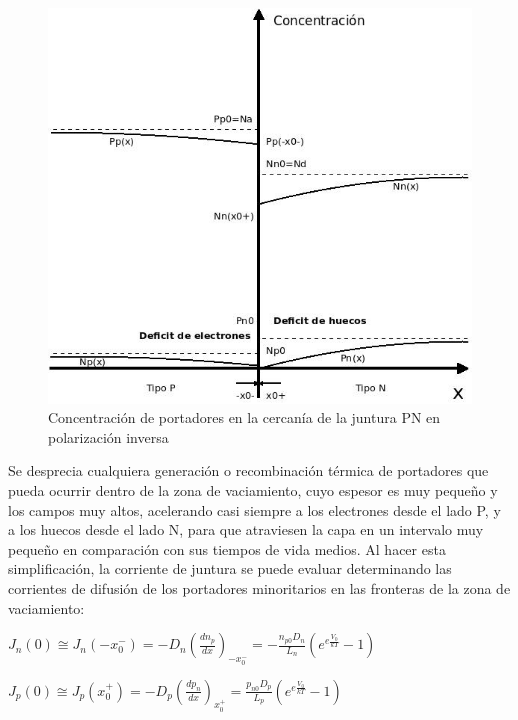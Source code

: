 \documentclass[oneside]{book}
\numberwithin{equation}{section}
\numberwithin{figure}{section}
\numberwithin{table}{section}
\begin{document}
				\begin{minipage}[t]{0.4\textwidth}
					\begin{figure}[H]
						\begin{center}
							\includegraphics[scale=0.35]{Concentracion-Inversa.jpeg}
							\caption{Concentración de portadores en la cercanía de la juntura PN en polarización inversa}
						\end{center}
					\end{figure}							
				\end{minipage}
				
				Se desprecia cualquiera generación o recombinación térmica de portadores que pueda ocurrir dentro de la zona de vaciamiento, cuyo espesor es muy pequeño y los campos muy altos, acelerando casi siempre a los electrones desde el lado P, y a los huecos desde el lado N, para que atraviesen la capa en un intervalo muy pequeño en comparación con sus tiempos de vida medios. Al hacer esta simplificación, la corriente de juntura se puede evaluar determinando las corrientes de difusión de los portadores minoritarios en las fronteras de la zona de vaciamiento:
				
				\begin{center}
					$\displaystyle J_n(0) \cong J_n(-x_0^-)=-D_n\left(\frac{d n_p}{dx}\right)_{-x_0^-}=-\frac{n_{p0}D_n}{L_n}\left(e^{e\frac{V_0}{kT}}-1\right)$
					
					$\displaystyle J_p(0) \cong J_p(x_0^+)=-D_p\left(\frac{d p_n}{dx}\right)_{x_0^+}=\frac{p_{n0}D_p}{L_p}\left(e^{e\frac{V_0}{kT}}-1\right)$
				\end{center}
		
\end{document}
